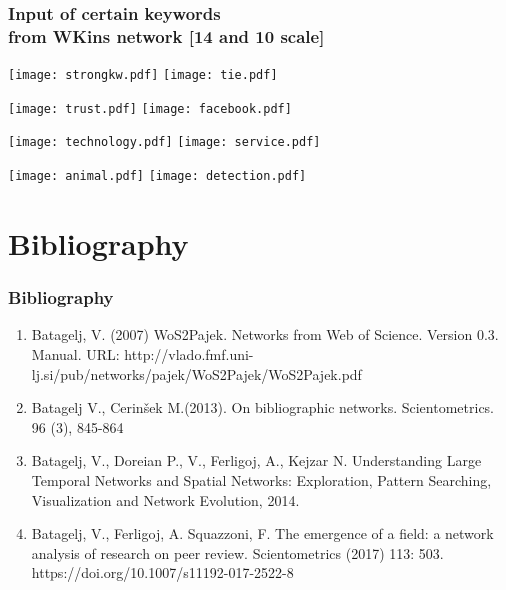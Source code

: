 \documentclass[hyperref={pdfstartview={FitBH -32768},
                         pdfpagemode=FullScreen,
                         plainpages=false,
                         colorlinks=true}
              ]{beamer}
\begin{document}
\begin{frame}[fragile]
\frametitle{Input of certain keywords  \\ \normalsize from WKins network [14 and 10 scale] }
\centerline{
\texttt{[image: strongkw.pdf]}
\texttt{[image: tie.pdf]}}
\centerline{
\texttt{[image: trust.pdf]}
\texttt{[image: facebook.pdf]}} 
\centerline{
\texttt{[image: technology.pdf]}
\texttt{[image: service.pdf]}}
\centerline{
\texttt{[image: animal.pdf]} 
\texttt{[image: detection.pdf]}}
\end{frame}  

\section{Bibliography}  

\begin{frame}[fragile]
\frametitle{Bibliography}
\small

\begin{enumerate}
\item Batagelj, V. (2007) WoS2Pajek. Networks from Web of Science. Version 0.3. Manual. URL: http://vlado.fmf.uni-lj.si/pub/networks/pajek/WoS2Pajek/WoS2Pajek.pdf

\item Batagelj V., Cerinšek M.(2013). On bibliographic networks. Scientometrics. 96 (3), 845-864

\item Batagelj, V., Doreian P., V., Ferligoj, A., Kejzar N. Understanding Large Temporal Networks and Spatial Networks: Exploration, Pattern Searching, Visualization and Network Evolution, 2014.

\item Batagelj, V., Ferligoj, A. Squazzoni, F. The emergence of a field: a network analysis of research on peer review. Scientometrics (2017) 113: 503. https://doi.org/10.1007/s11192-017-2522-8  

\end{enumerate}
\end{frame}
\end{document}
